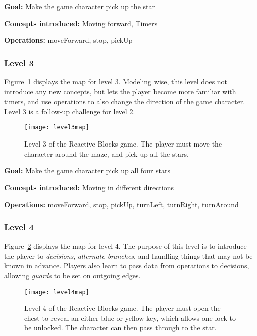 \noindent
\textbf{Goal:} Make the game character pick up the star

\noindent
\textbf{Concepts introduced:} Moving forward, Timers

\noindent
\textbf{Operations:} moveForward, stop, pickUp

\subsubsection{Level 3}
Figure~\ref{fig:level3map} displays the map for level 3. Modeling wise, this level does not introduce any new concepts, but lets the player become more familiar with timers, and use operations to also change the direction of the game character. Level 3 is a follow-up challenge for level 2.

\begin{figure}[htp]
	\centering
	\texttt{[image: level3map]}
	\caption[Level 3 of the Reactive Blocks game]{Level 3 of the Reactive Blocks game. The player must move the character around the maze, and pick up all the stars.}
	\label{fig:level3map}
\end{figure}

\noindent
\textbf{Goal:} Make the game character pick up all four stars

\noindent
\textbf{Concepts introduced:} Moving in different directions

\noindent
\textbf{Operations:} moveForward, stop, pickUp, turnLeft, turnRight, turnAround

\subsubsection{Level 4}
Figure~\ref{fig:level4map} displays the map for level 4. The purpose of this level is to introduce the player to \emph{decisions}, \emph{alternate branches}, and handling things that may not be known in advance. Players also learn to pass data from operations to decisions, allowing \emph{guards} to be set on outgoing edges.

\begin{figure}[htp]
	\centering
	\texttt{[image: level4map]}
	\caption[Level 4 of the Reactive Blocks game]{Level 4 of the Reactive Blocks game. The player must open the chest to reveal an either blue or yellow key, which allows one lock to be unlocked. The character can then pass through to the star.}
	\label{fig:level4map}
\end{figure}

